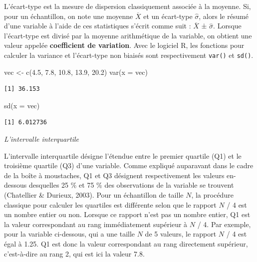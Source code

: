 \documentclass[
  letterpaper,
]{book}
\newenvironment{Shaded}{\begin{snugshade}}{\end{snugshade}}
\newcommand{\AttributeTok}[1]{\textcolor[rgb]{0.40,0.45,0.13}{#1}}
\newcommand{\FloatTok}[1]{\textcolor[rgb]{0.68,0.00,0.00}{#1}}
\newcommand{\FunctionTok}[1]{\textcolor[rgb]{0.28,0.35,0.67}{#1}}
\newcommand{\NormalTok}[1]{\textcolor[rgb]{0.00,0.23,0.31}{#1}}
\newcommand{\OtherTok}[1]{\textcolor[rgb]{0.00,0.23,0.31}{#1}}
\begin{document}
L'écart-type est la mesure de dispersion classiquement associée à la
moyenne. Si, pour un échantillon, on note une moyenne \(\overline{X}\)
et un écart-type \(\hat{\sigma}\), alors le résumé d'une variable à
l'aide de ces statistiques s'écrit comme suit : \(\overline{X}\) ±
\(\hat{\sigma}\). Lorsque l'écart-type est divisé par la moyenne
arithmétique de la variable, on obtient une valeur appelée
\textbf{coefficient de variation}. Avec le logiciel R, les fonctions
pour calculer la variance et l'écart-type non biaisés sont
respectivement \texttt{var()} et \texttt{sd()}.

\begin{Shaded}
\begin{Highlighting}[]
\NormalTok{vec }\OtherTok{\textless{}{-}} \FunctionTok{c}\NormalTok{(}\FloatTok{4.5}\NormalTok{, }\FloatTok{7.8}\NormalTok{, }\FloatTok{10.8}\NormalTok{, }\FloatTok{13.9}\NormalTok{, }\FloatTok{20.2}\NormalTok{)}
\FunctionTok{var}\NormalTok{(}\AttributeTok{x =}\NormalTok{ vec)}
\end{Highlighting}
\end{Shaded}

\begin{verbatim}
[1] 36.153
\end{verbatim}

\begin{Shaded}
\begin{Highlighting}[]
\FunctionTok{sd}\NormalTok{(}\AttributeTok{x =}\NormalTok{ vec)}
\end{Highlighting}
\end{Shaded}

\begin{verbatim}
[1] 6.012736
\end{verbatim}

\emph{L'intervalle interquartile}

L'intervalle interquartile désigne l'étendue entre le premier quartile
(Q1) et le troisième quartile (Q3) d'une variable. Comme expliqué
auparavant dans le cadre de la boîte à moustaches, Q1 et Q3 désignent
respectivement les valeurs en-dessous desquelles 25 \% et 75 \% des
observations de la variable se trouvent (Chatellier \& Durieux, 2003).
Pour un échantillon de taille \(N\), la procédure classique pour
calculer les quartiles est différente selon que le rapport \(N\) / 4 est
un nombre entier ou non. Lorsque ce rapport n'est pas un nombre entier,
Q1 est la valeur correspondant au rang immédiatement supérieur à \(N\) /
4. Par exemple, pour la variable ci-dessous, qui a une taille \(N\) de 5
valeurs, le rapport \(N\) / 4 est égal à 1.25. Q1 est donc la valeur
correspondant au rang directement supérieur, c'est-à-dire au rang 2, qui
est ici la valeur 7.8.
\end{document}
